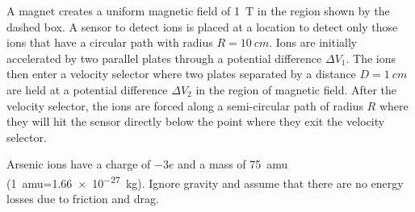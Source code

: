 A magnet creates a uniform magnetic field of \SI{1}{T} in the region shown by the dashed box. A sensor to detect ions is placed at a location to detect only those ions that have a circular path with radius $R=\SI{10}{cm}$. Ions are initially accelerated by two parallel plates through a potential difference $\Delta V_1$. The ions then enter a velocity selector where two plates separated by a distance $D=\SI{1}{cm}$ are held at a potential difference $\Delta V_2$ in the region of magnetic field. After the velocity selector, the ions are forced along a semi-circular path of radius $R$ where they will hit the sensor directly below the point where they exit the velocity selector.

Arsenic ions have a charge of $-3e$ and a mass of \SI{75}{amu} (\SI{1}{amu}=\SI{1.66e-27}{kg}). Ignore gravity and assume that there are no energy losses due to friction and drag. 


